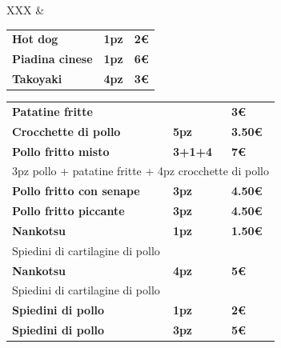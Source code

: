 \documentclass[hidelinks,10pt,a4paper]{article}
\newcommand{\mybox}[1]{
		\colorbox{square}{
		\begin{minipage}{0.97\linewidth}
			#1
		\end{minipage}
	}
}
\newcommand{\entryThreeDesc}[4]{
{\vspace*{-0.5mm}\textbf{\small{#1}}}&{\vspace*{-0.5mm}\textbf{\small{#3}}}&{\vspace*{-0.5mm}\textbf{\small{#4}}}\\
 \multicolumn{3}{l}{\textcolor{desc}{\footnotesize{#2}}} \\
}
\newcommand{\entryThreeSimple}[3]{
	{\textbf{\small{#1}}}&{\textbf{\small{#2}}}&{\textbf{\small{#3}}}\\
}
\begin{document}
\begin{landscape}
\begin{tabularx}{\linewidth}{XXX}
{		}&{
				
				\vspace*{0.1cm}			
				\mybox{
				\begin{tabular*}{\linewidth}{ l l l }
				\entryThreeSimple{Hot dog}{\hspace*{30mm}1pz}{\hspace*{13mm}2€}
				\entryThreeSimple{Piadina cinese}{\hspace*{30mm}1pz}{\hspace*{13mm}6€}
				\entryThreeSimple{Takoyaki}{\hspace*{30mm}4pz}{\hspace*{13mm}3€}
				\end{tabular*}
			}
			
			\mybox{
				\begin{tabular*}{\linewidth}{ l l l }
				\entryThreeSimple{Patatine fritte}{\hspace*{29mm}}{\hspace*{9mm}3€}
				\entryThreeSimple{Crocchette di pollo}{\hspace*{20mm}5pz}{\hspace*{9mm}3.50€}
				\entryThreeDesc{Pollo fritto misto }{3pz pollo + patatine fritte + 4pz crocchette di pollo}{\hspace*{20mm}3+1+4}{\hspace*{9mm}7€}
				\entryThreeSimple{Pollo fritto con senape}{\hspace*{5mm}{\Large\chili}\hspace*{10.5mm}3pz}{\hspace*{9mm}4.50€}
				\entryThreeSimple{Pollo fritto piccante}{\hspace*{5mm}{\Large\chili\chili}\hspace*{6mm}3pz}{\hspace*{9mm}4.50€}
				\entryThreeDesc{Nankotsu}{Spiedini di cartilagine di pollo}{\hspace*{5mm}{\Large\chili}\hspace*{10.5mm}1pz}{\hspace*{9mm}1.50€}
				\entryThreeDesc{Nankotsu}{Spiedini di cartilagine di pollo}{\hspace*{5mm}{\Large\chili}\hspace*{10.5mm}4pz}{\hspace*{9mm}5€}
				\entryThreeSimple{Spiedini di pollo}{\hspace*{5mm}{\Large\chili}\hspace*{10.5mm}1pz}{\hspace*{9mm}2€}
				\entryThreeSimple{Spiedini di pollo}{\hspace*{5mm}{\Large\chili}\hspace*{10.5mm}3pz}{\hspace*{9mm}5€}

\end{tabular*}}}
\end{tabularx}
\end{landscape}
\end{document}
